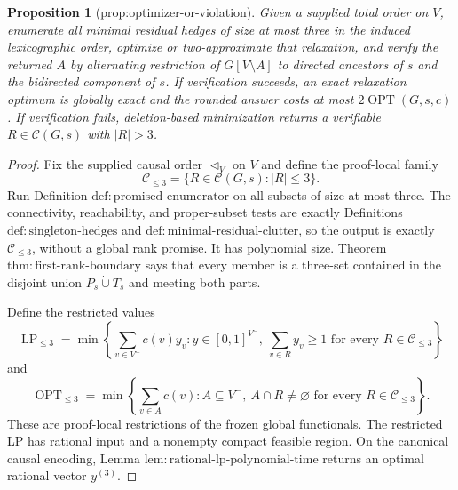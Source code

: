 \documentclass{article}
\newtheorem{proposition}{Proposition}
\begin{document}
\begin{proposition}[prop:optimizer-or-violation]\label{prop:optimizer-or-violation}
Given a supplied total order on \(V\), enumerate all minimal residual hedges of size at most three in the induced lexicographic order, optimize or two-approximate that relaxation, and verify the returned \(A\) by alternating restriction of \(G[V\setminus A]\) to directed ancestors of \(s\) and the bidirected component of \(s\). If verification succeeds, an exact relaxation optimum is globally exact and the rounded answer costs at most \(2\operatorname{OPT}(G,s,c)\). If verification fails, deletion-based minimization returns a verifiable \(R\in\mathcal C(G,s)\) with \(|R|>3\).
\end{proposition}
\begin{proof}
Fix the supplied causal order \(\triangleleft_V\) on \(V\) and define the
proof-local family
\[
 \mathcal C_{\leq3}=\{R\in\mathcal C(G,s):|R|\leq3\}.
\]
Run Definition \(\mathrm{def{:}promised\mbox{-}enumerator}\) on all
subsets of size at most three.  The connectivity, reachability, and
proper-subset tests are exactly Definitions
\(\mathrm{def{:}singleton\mbox{-}hedges}\) and
\(\mathrm{def{:}minimal\mbox{-}residual\mbox{-}clutter}\), so the output
is exactly \(\mathcal C_{\leq3}\), without a global rank promise.  It has
polynomial size.  Theorem
\(\mathrm{thm{:}first\mbox{-}rank\mbox{-}boundary}\) says that every
member is a three-set contained in the disjoint union
\(P_s\mathbin{\dot\cup}T_s\) and meeting both parts.

Define the restricted values
\[
 \operatorname{LP}_{\leq3}
 =\min\left\{\sum_{v\in V^{-}}c(v)y_v:
 y\in[0,1]^{V^{-}},\ \sum_{v\in R}y_v\geq1
 \text{ for every }R\in\mathcal C_{\leq3}\right\}
\]
and
\[
 \operatorname{OPT}_{\leq3}
 =\min\left\{\sum_{v\in A}c(v):
 A\subseteq V^{-},\ A\cap R\neq\varnothing
 \text{ for every }R\in\mathcal C_{\leq3}\right\}.
\]
These are proof-local restrictions of the frozen global functionals.  The
restricted LP has rational input and a nonempty compact feasible region.
On the canonical causal encoding, Lemma
\(\mathrm{lem{:}rational\mbox{-}lp\mbox{-}polynomial\mbox{-}time}\)
returns an optimal rational vector \(y^{(3)}\).


\end{proof}
\end{document}
